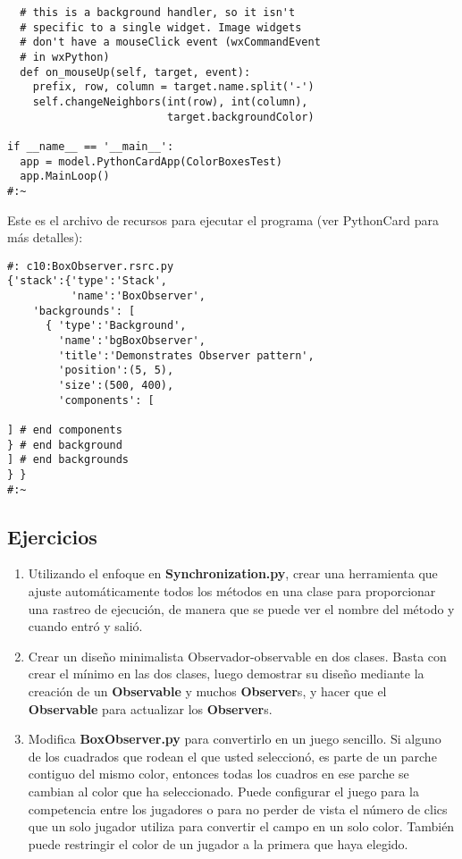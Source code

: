 \begin{lstlisting}
  # this is a background handler, so it isn't   
  # specific to a single widget. Image widgets  
  # don't have a mouseClick event (wxCommandEvent 
  # in wxPython) 
  def on_mouseUp(self, target, event): 
    prefix, row, column = target.name.split('-') 
    self.changeNeighbors(int(row), int(column),  
                         target.backgroundColor) 
                         
if __name__ == '__main__': 
  app = model.PythonCardApp(ColorBoxesTest) 
  app.MainLoop() 
#:~ 
\end{lstlisting}

Este es el archivo de recursos para ejecutar el programa (ver PythonCard para más detalles):  \newline

\begin{lstlisting} 
#: c10:BoxObserver.rsrc.py 
{'stack':{'type':'Stack', 
          'name':'BoxObserver', 
    'backgrounds': [ 
      { 'type':'Background', 
        'name':'bgBoxObserver', 
        'title':'Demonstrates Observer pattern', 
        'position':(5, 5), 
        'size':(500, 400), 
        'components': [ 
        
] # end components 
} # end background 
] # end backgrounds 
} } 
#:~ 
\end{lstlisting}


\subsection*{Ejercicios}
\label{subsec:Ejercicios12}

\begin{enumerate}

    \item Utilizando el enfoque en  \textbf{Synchronization.py}, crear una herramienta que ajuste automáticamente todos los métodos en una clase para proporcionar una rastreo de ejecución, de manera que se puede ver el nombre del método y cuando entró y salió.
    
    \item Crear un diseño minimalista Observador-observable en dos clases. Basta con crear el mínimo en las dos clases, luego demostrar su diseño mediante la creación de un \textbf{Observable} y muchos \textbf{Observer}s, y hacer que el \textbf{Observable} para actualizar los \textbf{Observer}s.
    
    \item Modifica \textbf{BoxObserver.py} para convertirlo en un juego sencillo. Si alguno de los cuadrados que rodean el que usted seleccionó, es parte de un parche contiguo del mismo color, entonces todas los cuadros en ese parche se cambian al color que ha seleccionado. Puede configurar el juego para la competencia entre los jugadores o para no perder de vista el número de clics que un solo jugador utiliza para convertir el campo en un solo color. También puede restringir el color de un jugador a la primera que haya elegido.

\end{enumerate}